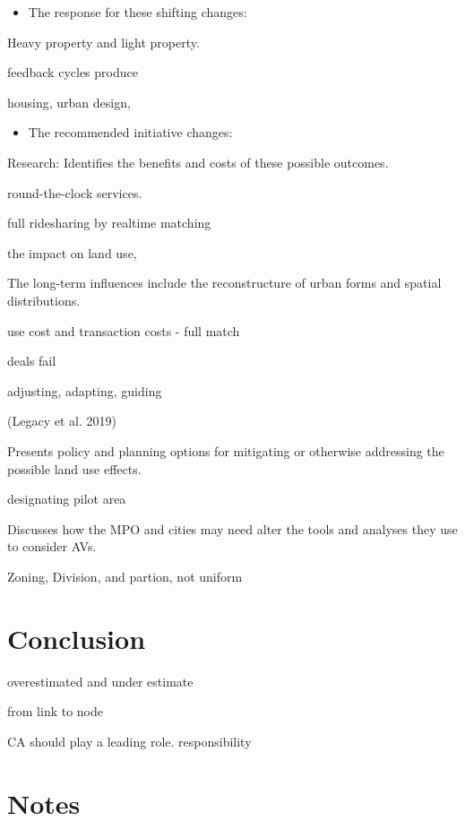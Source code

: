 \documentclass[12pt,]{article}
\providecommand{\tightlist}{%
  \setlength{\itemsep}{0pt}\setlength{\parskip}{0pt}}
\begin{document}
\begin{itemize}
\tightlist
\item
  The response for these shifting changes:
\end{itemize}

Heavy property and light property.

feedback cycles produce

housing, urban design,

\begin{itemize}
\tightlist
\item
  The recommended initiative changes:
\end{itemize}

Research: Identifies the benefits and costs of these possible outcomes.

round-the-clock services.

full ridesharing by realtime matching

the impact on land use,

The long-term influences include the reconstructure of urban forms and
spatial distributions.

use cost and transaction costs - full match

deals fail

adjusting, adapting, guiding

(Legacy et al. 2019)

Presents policy and planning options for mitigating or otherwise
addressing the possible land use effects.

designating pilot area

Discusses how the MPO and cities may need alter the tools and analyses
they use to consider AVs.

Zoning, Division, and partion, not uniform

\hypertarget{conclusion}{%
\section{Conclusion}\label{conclusion}}

overestimated and under estimate

from link to node

CA should play a leading role. responsibility

\hypertarget{notes}{%
\section{Notes}\label{notes}}
\end{document}
